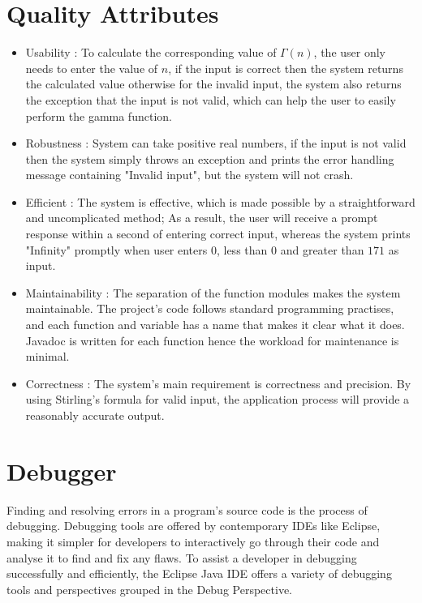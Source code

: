 \documentclass[a4paper, 11pt]{article}
\begin{document}
\section{Quality Attributes}
\begin{itemize}
    \item{Usability : To calculate the corresponding value of $\Gamma \left( n \right)$, the user only needs to enter the value of $n$, if the input is correct then the system returns the calculated value otherwise for the invalid input, the system also returns the exception that the input is not valid, which can help the user to easily perform the gamma function.}
    
    \item{Robustness : System can take positive real numbers, if the input is not valid then the system simply throws an exception and prints the error handling message containing "Invalid input", but the system will not crash. }
    
    \item{Efficient : The system is effective, which is made possible by a straightforward and uncomplicated method; As a result, the user will receive a prompt response within a second of entering correct input, whereas the system prints "Infinity" promptly when user enters $0$, less than $0$ and greater than $171$ as input. }
    
    \item{Maintainability : The separation of the function modules makes the system maintainable. The project's code follows standard programming practises, and each function and variable has a name that makes it clear what it does. Javadoc is written for each function hence the workload for maintenance is minimal.}
    
    \item{Correctness : The system's main requirement is correctness and precision. By using Stirling's formula for valid input, the application process will provide a reasonably accurate output.}
\end{itemize}

\newpage

\section{Debugger}
Finding and resolving errors in a program's source code is the process of debugging. Debugging tools are offered by contemporary IDEs like Eclipse, making it simpler for developers to interactively go through their code and analyse it to find and fix any flaws. To assist a developer in debugging successfully and efficiently, the Eclipse Java IDE offers a variety of debugging tools and perspectives grouped in the Debug Perspective.
\end{document}
